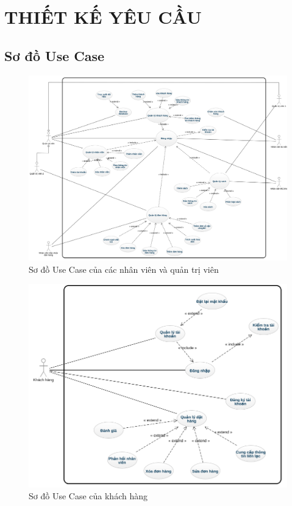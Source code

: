 \documentclass{report}
\begin{document}
\chapter{THIẾT KẾ YÊU CẦU}
\section{Sơ đồ Use Case}
\begin{figure}[htp]
    \centering
    \includegraphics[scale = 0.3]{image/UseCaseDiagram_employee.png}
    \caption{Sơ đồ Use Case của các nhân viên và quản trị viên}
\end{figure}

\begin{figure}[htp]
    \centering
    \includegraphics[scale = 0.5]{image/UseCaseDiagram_Customer.png}
    \caption{Sơ đồ Use Case của khách hàng}
\end{figure}
\end{document}
